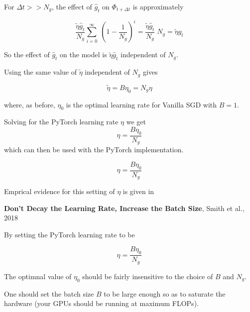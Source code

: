 {For $\Delta t >> N_g$, the effect of $\hat{g}_t$ on $\Phi_{t+\Delta t}$ is approximately

$$\frac{\tilde{\eta}\hat{g}_t}{N_g}\sum_{i = 0}^\infty \;\left(1 - \frac{1}{N_g}\right)^i = \frac{\tilde{\eta}\hat{g}_t}{N_g}\;N_g = \tilde{\eta}\hat{g}_t$$

\vfill
{\color{red} So the effect of $\hat{g}_t$ on the model is $\tilde{\eta}\hat{g}_t$ independent of $N_g$.}


Using the same value of $\tilde{\eta}$ independent of $N_g$ gives

$$\tilde{\eta} = B\eta_0 = N_g\eta$$

where, as before, $\eta_0$ is the optimal learning rate for Vanilla SGD with $B = 1$.

\vfill
Solving for the PyTorch learning rate $\eta$ we get
{\color{red} $$\eta = \frac{B\eta_0}{N_g}$$}
which can then be used with the PyTorch implementation.


{\color{red} $$\eta = \frac{B\eta_0}{N_g}$$}

\vfill
Emprical evidence for this setting of $\eta$ is given in

\vfill
{\bf Don't Decay the Learning Rate, Increase the Batch Size}, Smith et al., 2018


By setting the PyTorch learning rate to be

{\color{red} $$\eta = \frac{B\eta_0}{N_g}$$}

\vfill
The optimnal value of $\eta_0$ should be fairly insensitive to the choice of $B$ and $N_g$.

\vfill
One should set the batch size $B$ to be large enough so as to saturate the hardware (your GPUs should be running at maximum FLOPs).


} 

